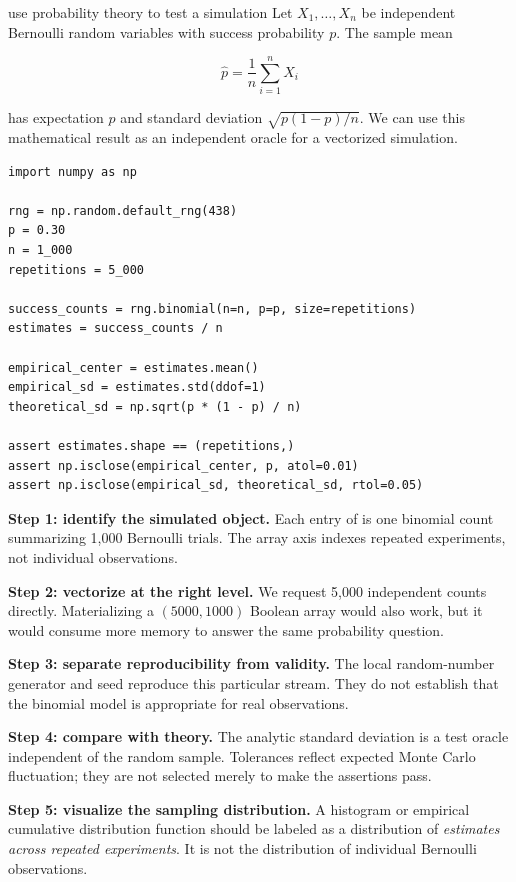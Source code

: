 \begin{workedexample}{use probability theory to test a simulation}
Let $X_1,\ldots,X_n$ be independent Bernoulli random variables with success
probability $p$. The sample mean

\[
  \widehat{p}=\frac{1}{n}\sum_{i=1}^{n}X_i
\]

has expectation $p$ and standard deviation
$\sqrt{p(1-p)/n}$. We can use this mathematical result as an independent oracle
for a vectorized simulation.

\begin{lstlisting}
import numpy as np

rng = np.random.default_rng(438)
p = 0.30
n = 1_000
repetitions = 5_000

success_counts = rng.binomial(n=n, p=p, size=repetitions)
estimates = success_counts / n

empirical_center = estimates.mean()
empirical_sd = estimates.std(ddof=1)
theoretical_sd = np.sqrt(p * (1 - p) / n)

assert estimates.shape == (repetitions,)
assert np.isclose(empirical_center, p, atol=0.01)
assert np.isclose(empirical_sd, theoretical_sd, rtol=0.05)
\end{lstlisting}

\textbf{Step 1: identify the simulated object.} Each entry of
 is one binomial count summarizing 1,000 Bernoulli trials.
The array axis indexes repeated experiments, not individual observations.

\textbf{Step 2: vectorize at the right level.} We request 5,000 independent
counts directly. Materializing a $(5000,1000)$ Boolean array would also work,
but it would consume more memory to answer the same probability question.

\textbf{Step 3: separate reproducibility from validity.} The local random-number
generator and seed reproduce this particular stream. They do not establish that
the binomial model is appropriate for real observations.

\textbf{Step 4: compare with theory.} The analytic standard deviation is a test
oracle independent of the random sample. Tolerances reflect expected Monte
Carlo fluctuation; they are not selected merely to make the assertions pass.

\textbf{Step 5: visualize the sampling distribution.} A histogram or empirical
cumulative distribution function should be labeled as a distribution of
\emph{estimates across repeated experiments}. It is not the distribution of
individual Bernoulli observations.
\end{workedexample}

